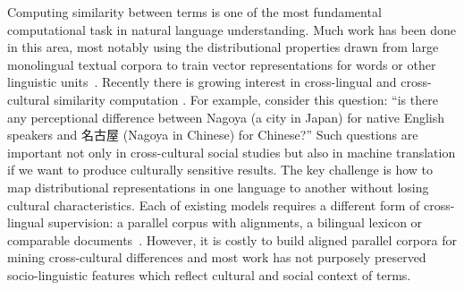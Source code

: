 Computing similarity between terms is one of the most fundamental
computational task in natural language understanding. Much work has been done
in this area, most notably using the distributional properties drawn from large monolingual textual
corpora to train vector representations for words or other 
linguistic units~\cite{Mikolov2013distributed,pennington2014glove}. 
Recently there is growing interest in cross-lingual and cross-cultural similarity computation \cite{luong2015bilingual,PennebakerIdentifying}.
For example, consider this question: ``is there any perceptional difference between Nagoya 
(a city in Japan) for native English speakers and 名古屋 (Nagoya in Chinese) for Chinese?'' 
Such questions are important not only in 
cross-cultural social studies but also in machine translation if we want to produce culturally sensitive results. The key challenge is how to map distributional representations in
one language to another without losing cultural characteristics.
Each of existing models requires a different form of cross-lingual supervision: a parallel corpus with alignments, a bilingual lexicon or comparable documents~\cite{upadhyay2016cross}.
However, it is costly to build aligned parallel corpora for mining cross-cultural differences and most work has not purposely preserved socio-linguistic features which reflect cultural and social context of terms.

